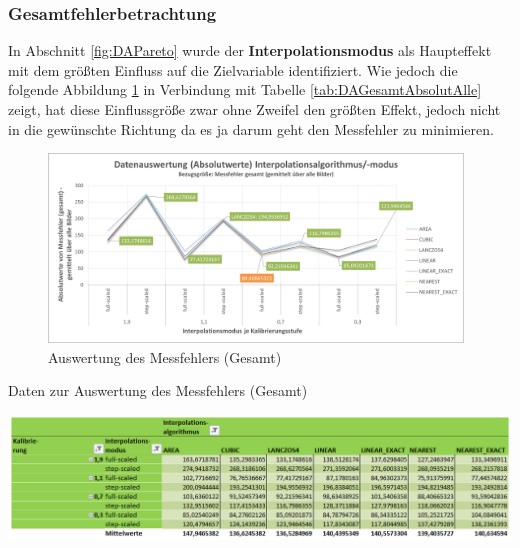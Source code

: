 \documentclass[
fontsize=10pt, 
listof = totoc,
parskip = half	
]{report}
\begin{document}
\subsubsection{Gesamtfehlerbetrachtung}
\label{subsubsec:AuswertungGesamtfehlerbetrachtung}
 In Abschnitt \ref{fig:DAPareto} wurde der \textbf{Interpolationsmodus} als Haupteffekt mit dem größten Einfluss auf die Zielvariable identifiziert. Wie jedoch die folgende Abbildung \ref{fig:DAGesamtAbsolut_Alle} in Verbindung mit Tabelle \ref{tab:DAGesamtAbsolutAlle} zeigt, hat diese Einflussgröße zwar ohne Zweifel den größten Effekt, jedoch nicht in die gewünschte Richtung da es ja darum geht den Messfehler zu minimieren. 

\begin{figure}[H]
	\centering
	\includegraphics[width=11cm, height=\textheight, keepaspectratio]{pics/DA_Gesamt_Absolut_Alle}
	\caption{Auswertung des Messfehlers (Gesamt)}
	\label{fig:DAGesamtAbsolut_Alle}
\end{figure}
	
\begin{table}[H]
	\centering
	\caption{Daten zur Auswertung des Messfehlers (Gesamt)}
	\label{tab:DAGesamtAbsolutAlle}
	\includegraphics[width=\textwidth,height=\textheight,keepaspectratio]{pics/Tab_DA_Gesamt_Absolut_Alle}
\end{table}
\end{document}
